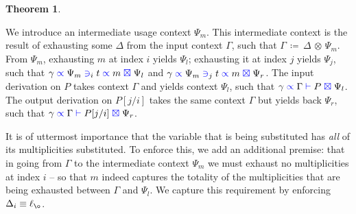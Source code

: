 \documentclass[a4paper,UKenglish,cleveref, autoref, thm-restate,authorcolumns]{lipics-v2019}
\theoremstyle{definition}
\newtheorem{nitheorem}[theorem]{Theorem}
\newcommand{\type}[1]{\textcolor{blue}{\operatorname{#1}}}
\newcommand{\subst}[3]{#1[#2/#3]}
\newcommand{\opctx}[3]{#1 \, \coloneqq \, #2 \, \otimes \, #3}
\newcommand{\types}[4]{#1 \; \type{\propto} \; #2 \; \type{\vdash} \; #3 \; \type{\boxtimes} \; #4}
\newcommand{\contains}[6]{#1 \; \type{\propto} \; #2 \; \type{\ni}_{#3} \; #4 \; \type{\propto} \; #5 \; \type{\boxtimes} \; #6}
\begin{document}
\begin{nitheorem}
  \label{th:subst-generalization}

  We introduce an intermediate usage context $\Psi_m$.
  This intermediate context is the result of exhausting some $\Delta$ from the input context $\Gamma$, such that $\opctx{\Gamma}{\Delta}{\Psi_m}$.
  From $\Psi_m$, exhausting $m$ at index $i$ yields $\Psi_l$; exhausting it at index $j$ yields $\Psi_j$, such that $\contains{\gamma}{\Psi_m}{i}{t}{m}{\Psi_l}$ and $\contains{\gamma}{\Psi_m}{j}{t}{m}{\Psi_r}$.
  The input derivation on $P$ takes context $\Gamma$ and yields context $\Psi_l$, such that $\types{\gamma}{\Gamma}{P}{\Psi_l}$.
  The output derivation on $\subst{P}{j}{i}$ takes the same context $\Gamma$ but yields back $\Psi_r$, such that $\types{\gamma}{\Gamma}{\subst{P}{j}{i}}{\Psi_r}$.

  \begin{remark}
    \label{re:delta-zero}
    It is of uttermost importance that the variable that is being substituted has \emph{all} of its multiplicities substituted.
    To enforce this, we add an additional premise: that in going from $\Gamma$ to the intermediate context $\Psi_m$ we must exhaust no multiplicities at index $i$ -- so that $m$ indeed captures the totality of the multiplicities that are being exhausted between $\Gamma$ and $\Psi_l$.
    We capture this requirement by enforcing $\Delta_i \equiv \ell_{\o}$.
  \end{remark}
\end{nitheorem}
\end{document}
